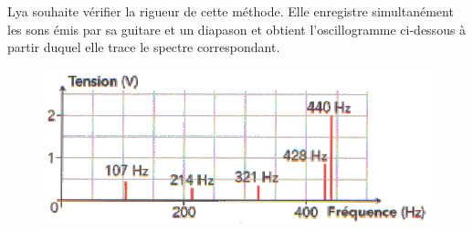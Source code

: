 \vspace{0.3cm}

Lya souhaite vérifier la rigueur de cette méthode. Elle enregistre simultanément les sons émis par sa guitare et un diapason et obtient l'oscillogramme ci-dessous à partir duquel elle trace le spectre correspondant.

\begin{figure}[h]
\begin{center}
\includegraphics[width=0.5\columnwidth]{images/Exo2_Ondes_Oscillogramme}
\end{center}
\end{figure}

\vspace{0.3cm}

